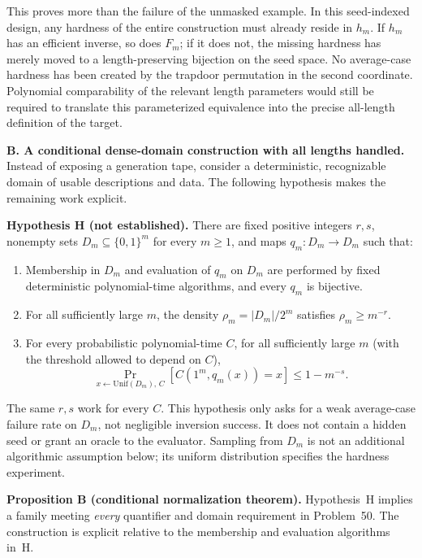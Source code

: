 \documentclass[11pt,a4paper]{article}
\numberwithin{equation}{section}
\begin{document}
This proves more than the failure of the unmasked example. In this
seed-indexed design, any hardness of the entire construction must
already reside in $h_m$. If $h_m$ has an efficient inverse, so does
$F_m$; if it does not, the missing hardness has merely moved to a
length-preserving bijection on the seed space. No average-case hardness
has been created by the trapdoor permutation in the second coordinate.
Polynomial comparability of the relevant length parameters would still
be required to translate this parameterized equivalence into the precise
all-length definition of the target.

\medskip{}
\textbf{B. A conditional dense-domain construction with all lengths handled.}
Instead of exposing a generation tape, consider a deterministic,
recognizable domain of usable descriptions and data. The following
hypothesis makes the remaining work explicit.

\textbf{Hypothesis H (not established).}
There are fixed positive integers $r,s$, nonempty sets
$D_m\subseteq\{0,1\}^m$ for every $m\ge1$, and maps
$q_m:D_m\to D_m$ such that:
\begin{enumerate}[label=(\roman*),leftmargin=2.8em,itemsep=3pt]
\item Membership in $D_m$ and evaluation of $q_m$ on $D_m$ are performed
by fixed deterministic polynomial-time algorithms, and every $q_m$ is
bijective.
\item For all sufficiently large $m$, the density
$\rho_m=|D_m|/2^m$ satisfies $\rho_m\ge m^{-r}$.
\item For every probabilistic polynomial-time $C$, for all sufficiently
large $m$ (with the threshold allowed to depend on $C$),
\begin{equation}\label{eq:50:H}
 \Pr_{x\leftarrow\mathrm{Unif}(D_m),\,C}
       [C(1^m,q_m(x))=x]\le 1-m^{-s}.
\end{equation}
\end{enumerate}
The same $r,s$ work for every $C$. This hypothesis only asks for a weak
average-case failure rate on $D_m$, not negligible inversion success.
It does not contain a hidden seed or grant an oracle to the evaluator.
Sampling from $D_m$ is not an additional algorithmic assumption below;
its uniform distribution specifies the hardness experiment.

\textbf{Proposition B (conditional normalization theorem).}
Hypothesis~H implies a family meeting \emph{every} quantifier and domain
requirement in Problem~50. The construction is explicit relative to the
membership and evaluation algorithms in~H.
\end{document}
